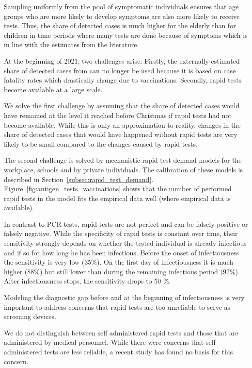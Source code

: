 Sampling uniformly from the pool of symptomatic individuals ensures that age groups who
are more likely to develop symptoms are also more likely to receive tests. Thus, the
share of detected cases is much higher for the elderly than for children in time periods
where many tests are done because of symptoms which is in line with the estimates from
the literature. 

At the beginning of 2021, two challenges arise: Firstly, the externally estimated share
of detected cases from \citet{Dunkelzifferradar2020} can no longer be used because it is
based on case fatality rates which drastically change due to vaccinations. Secondly,
rapid tests become available at a large scale.

We solve the first challenge by assuming that the share of detected cases would have
remained at the level it reached before Christmas if rapid tests had not become
available. While this is only an approximation to reality, changes in the share of
detected cases that would have happened without rapid tests are very likely to be small
compared to the changes caused by rapid tests.

The second challenge is solved by mechanistic rapid test demand models for the
workplace, schools and by private individuals. The calibration of these models is
described in Section~\ref{subsec:rapid_test_demand}.
Figure~\ref{fig:antigen_tests_vaccinations} shows that the number of performed rapid
tests in the model fits the empirical data well (where empirical data is available).

In contrast to PCR tests, rapid tests are not perfect and can be falsely positive or
falsely negative. While the specificity of rapid tests is constant over time, their
sensitivity strongly depends on whether the tested individual is already infectious and
if so for how long he has been infectious. Before the onset of infectiousness the
sensitivity is very low (35\%). On the first day of infectiousness it is much higher
(88\%) but still lower than during the remaining infectious period (92\%). After
infectiousness stops, the sensitivity drops to 50 \%.

Modeling the diagnostic gap before and at the beginning of infectiousness is very
important to address concerns that rapid tests are too unreliable to serve as screening
devices.

We do not distinguish between self administered rapid tests and those that are
administered by medical personnel. While there were concerns that self administered
tests are less reliable, a recent study has found no basis for this
concern.

